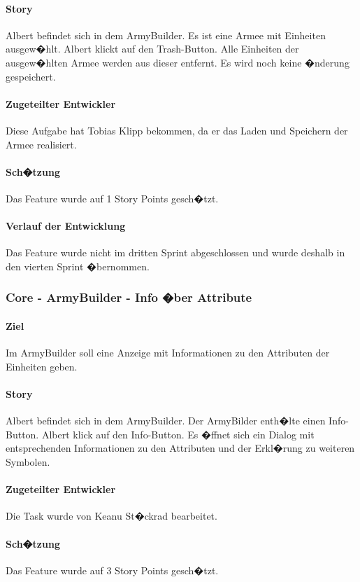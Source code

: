 \documentclass[12pt, titlepage]{scrartcl}
\begin{document}
		\paragraph{Story}Albert befindet sich in dem ArmyBuilder. Es ist eine Armee mit Einheiten ausgew�hlt. Albert klickt auf den Trash-Button. Alle Einheiten der ausgew�hlten Armee werden aus dieser entfernt. Es wird noch keine �nderung gespeichert.
		\paragraph{Zugeteilter Entwickler} Diese Aufgabe hat Tobias Klipp bekommen, da er das Laden und Speichern der Armee realisiert.
		\paragraph{Sch�tzung}
		Das Feature wurde auf 1 Story Points gesch�tzt.
		\paragraph{Verlauf der Entwicklung} 
		Das Feature wurde nicht im dritten Sprint abgeschlossen und wurde deshalb in den vierten Sprint �bernommen.
		
		\subsubsection{Core - ArmyBuilder - Info �ber Attribute}
		\paragraph{Ziel} Im ArmyBuilder soll eine Anzeige mit Informationen zu den Attributen der Einheiten geben.
		\paragraph{Story}Albert befindet sich in dem ArmyBuilder. Der ArmyBilder enth�lte einen Info-Button. Albert klick auf den Info-Button. Es �ffnet sich ein Dialog mit entsprechenden Informationen zu den Attributen und der Erkl�rung zu weiteren Symbolen.
		\paragraph{Zugeteilter Entwickler} Die Task wurde von Keanu St�ckrad bearbeitet.
		\paragraph{Sch�tzung}
		Das Feature wurde auf 3 Story Points gesch�tzt.
\end{document}
